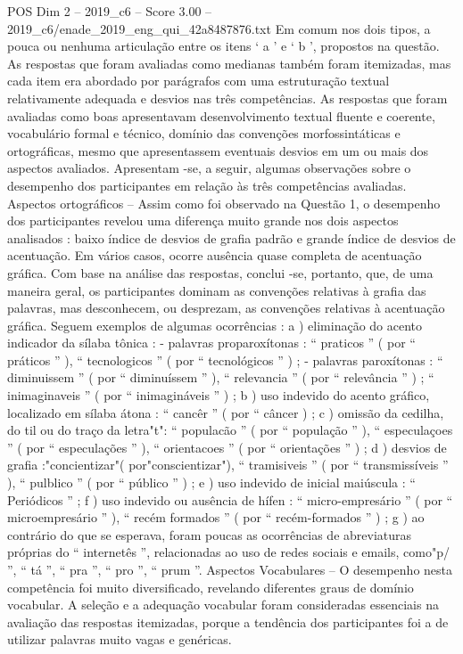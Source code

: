 \begin{textsample}{POS Dim 2 – 2019\_c6 – Score 3.00 – 2019\_c6/enade\_2019\_eng\_qui\_42a8487876.txt}
Em comum nos dois tipos, a pouca ou nenhuma articulação entre os itens ‘ a ’ e ‘ b ’, propostos na questão.
As respostas que foram avaliadas como medianas também foram itemizadas, mas cada item era abordado por parágrafos com uma estruturação textual relativamente adequada e desvios nas três competências.
As respostas que foram avaliadas como boas apresentavam desenvolvimento textual fluente e coerente, vocabulário formal e técnico, domínio das convenções morfossintáticas e ortográficas, mesmo que apresentassem eventuais desvios em um ou mais dos aspectos avaliados.
Apresentam -se, a seguir, algumas observações sobre o desempenho dos participantes em relação às três competências avaliadas.
Aspectos ortográficos – Assim como foi observado na Questão 1, o desempenho dos participantes revelou uma diferença muito grande nos dois aspectos analisados : baixo índice de desvios de grafia padrão e grande índice de desvios de acentuação.
Em vários casos, ocorre ausência quase completa de acentuação gráfica.
Com base na análise das respostas, conclui -se, portanto, que, de uma maneira geral, os participantes dominam as convenções relativas à grafia das palavras, mas desconhecem, ou desprezam, as convenções relativas à acentuação gráfica.
Seguem exemplos de algumas ocorrências : a ) eliminação do acento indicador da sílaba tônica : - palavras proparoxítonas : “ praticos ” ( por “ práticos ” ), “ tecnologicos ” ( por “ tecnológicos ” ) ; - palavras paroxítonas : “ diminuissem ” ( por “ diminuíssem ” ), “ relevancia ” ( por “ relevância ” ) ; “ inimaginaveis ” ( por “ inimagináveis ” ) ; b ) uso indevido do acento gráfico, localizado em sílaba átona : “ cancêr ” ( por “ câncer ) ; c ) omissão da cedilha, do til ou do traço da letra"t": “ populacão ” ( por “ população ” ), “ especulaçoes ” ( por “ especulações ” ), “ orientacoes ” ( por “ orientações ” ) ; d ) desvios de grafia :"concientizar"( por"conscientizar"), “ tramisiveis ” ( por “ transmissíveis ” ), “ pulblico ” ( por “ público ” ) ; e ) uso indevido de inicial maiúscula : “ Periódicos ” ; f ) uso indevido ou ausência de hífen : “ micro-empresário ” ( por “ microempresário ” ), “ recém formados ” ( por “ recém-formados ” ) ; g ) ao contrário do que se esperava, foram poucas as ocorrências de abreviaturas próprias do “ internetês ”, relacionadas ao uso de redes sociais e emails, como"p/ ”, “ tá ”, “ pra ”, “ pro ”, “ prum ”.
Aspectos Vocabulares – O desempenho nesta competência foi muito diversificado, revelando diferentes graus de domínio vocabular.
A seleção e a adequação vocabular foram consideradas essenciais na avaliação das respostas itemizadas, porque a tendência dos participantes foi a de utilizar palavras muito vagas e genéricas.

\end{textsample}
